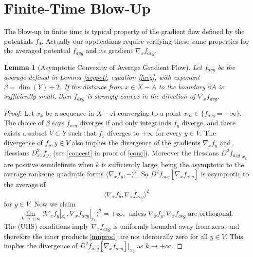 \documentclass[12pt]{amsart}
\newtheorem{lem}{Lemma}
\theoremstyle{definition}
\theoremstyle{remark}
\newcommand{\del}{\partial}
\begin{document}
\section{Finite-Time Blow-Up}


The blow-up in finite time is typical property of the gradient flow defined by the potentials $f_0$. Actually our applications require verifying these same properties for the averaged potential $f_{avg}$ and its gradient $\nabla_x f_{avg}$. 

\begin{lem}[Asymptotic Convexity of Average Gradient Flow]\label{conc1} 
Let $f_{avg}$ be the average defined in Lemma \ref{avgpot}, equation \eqref{favg}, with exponent $\beta=\dim(Y)+2$. If the distance from $x\in X-A$ to the boundary $\del A$ is sufficiently small, then $f_{avg}$ is strongly convex in the direction of $\nabla_x f_{avg}$.
\end{lem}
\begin{proof}
Let ${x_k}$ be a sequence in $X-A$ converging to a point $x_\infty\in \{f_{avg}=+\infty\}$. The choice of $\beta$ says $f_{avg}$ diverges if and only integrands $f_y$ diverge, and there exists a subset $V \subset Y$ such that $f_y$ diverges to $+\infty$ for every $y\in V$. The divergence of $f_y, y\in V$ also implies the divergence of the gradients $\nabla_x f_y$ and Hessians $D_{xx}^2f_y$, (see \eqref{concest} in proof of \ref{conc}). Moreover the Hessians $D^2 f_{avg}|_{x_k}$ are positive semidefinite when $k$ is sufficiently large, being the asymptotic to the average rank-one quadratic forms $\langle \nabla_x f_y , - \rangle^2$. So $D^2f_{avg}[\nabla_x f_{avg}]$ is asymptotic to the average of \begin{equation} \label{innprod}
\langle \nabla_x f_y, \nabla_x f_{avg} \rangle^2
\end{equation} for $y\in V$. Now we claim $$\lim_{k\to +\infty} \langle \nabla_x f_y|_{x_k}, \nabla_x f_{avg}|_{x_k} \rangle^2=+\infty, \text{~unless~} \nabla_x f_y,  \nabla_x f_{avg} \text{~are orthogonal}.$$ The (UHS) conditions imply $\nabla_x f_{avg}$ is uniformly bounded away from zero, and therefore the inner products \eqref{innprod} are not identically zero for all $y\in V$. This implies the divergence of $D^2f_{avg}[\nabla_x f_{avg}]|_{x_k}$ as $k\to +\infty$. 

\end{proof}
 
\end{document}
